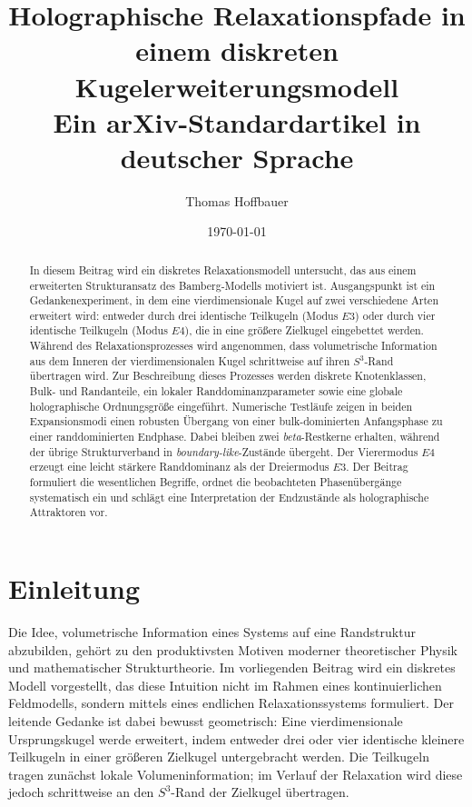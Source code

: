 \documentclass[11pt,a4paper]{article}
\title{Holographische Relaxationspfade in einem diskreten Kugelerweiterungsmodell\\
	\large Ein arXiv-Standardartikel in deutscher Sprache}
\author{Thomas Hoffbauer}
\date{\today}
\theoremstyle{definition}
\theoremstyle{remark}
\begin{document}
	\maketitle
	
	\begin{abstract}
		In diesem Beitrag wird ein diskretes Relaxationsmodell untersucht, das aus einem erweiterten Strukturansatz des Bamberg-Modells motiviert ist. Ausgangspunkt ist ein Gedankenexperiment, in dem eine vierdimensionale Kugel auf zwei verschiedene Arten erweitert wird: entweder durch drei identische Teilkugeln (Modus $E3$) oder durch vier identische Teilkugeln (Modus $E4$), die in eine größere Zielkugel eingebettet werden. Während des Relaxationsprozesses wird angenommen, dass volumetrische Information aus dem Inneren der vierdimensionalen Kugel schrittweise auf ihren $S^3$-Rand übertragen wird. Zur Beschreibung dieses Prozesses werden diskrete Knotenklassen, Bulk- und Randanteile, ein lokaler Randdominanzparameter sowie eine globale holographische Ordnungsgröße eingeführt. Numerische Testläufe zeigen in beiden Expansionsmodi einen robusten Übergang von einer bulk-dominierten Anfangsphase zu einer randdominierten Endphase. Dabei bleiben zwei \emph{beta}-Restkerne erhalten, während der übrige Strukturverband in \emph{boundary-like}-Zustände übergeht. Der Vierermodus $E4$ erzeugt eine leicht stärkere Randdominanz als der Dreiermodus $E3$. Der Beitrag formuliert die wesentlichen Begriffe, ordnet die beobachteten Phasenübergänge systematisch ein und schlägt eine Interpretation der Endzustände als holographische Attraktoren vor.
	\end{abstract}
	
	\section{Einleitung}
	Die Idee, volumetrische Information eines Systems auf eine Randstruktur abzubilden, gehört zu den produktivsten Motiven moderner theoretischer Physik und mathematischer Strukturtheorie. Im vorliegenden Beitrag wird ein diskretes Modell vorgestellt, das diese Intuition nicht im Rahmen eines kontinuierlichen Feldmodells, sondern mittels eines endlichen Relaxationssystems formuliert. Der leitende Gedanke ist dabei bewusst geometrisch: Eine vierdimensionale Ursprungskugel werde erweitert, indem entweder drei oder vier identische kleinere Teilkugeln in einer größeren Zielkugel untergebracht werden. Die Teilkugeln tragen zunächst lokale Volumeninformation; im Verlauf der Relaxation wird diese jedoch schrittweise an den $S^3$-Rand der Zielkugel übertragen.
	
\end{document}
